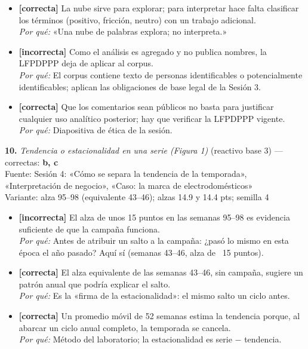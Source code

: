 \documentclass[10pt,letterpaper]{article}
\begin{document}
{\begin{itemize}[leftmargin=1.2em,itemsep=0pt,topsep=1pt,parsep=0pt]
\item[\textbf{b)}] {\footnotesize \textbf{[correcta]} La nube sirve para explorar; para interpretar hace falta clasificar los términos (positivo, fricción, neutro) con un trabajo adicional.\\ \textit{Por qué:} «Una nube de palabras explora; no interpreta.»}
\item[\textbf{c)}] {\footnotesize \textbf{[incorrecta]} Como el análisis es agregado y no publica nombres, la LFPDPPP deja de aplicar al corpus.\\ \textit{Por qué:} El corpus contiene texto de personas identificables o potencialmente identificables; aplican las obligaciones de base legal de la Sesión 3.}
\item[\textbf{d)}] {\footnotesize \textbf{[correcta]} Que los comentarios sean públicos no basta para justificar cualquier uso analítico posterior; hay que verificar la LFPDPPP vigente.\\ \textit{Por qué:} Diapositiva de ética de la sesión.}
\end{itemize}
\vspace{3pt}\noindent\textbf{10.} \textit{Tendencia o estacionalidad en una serie (Figura 1)} (reactivo base 3) — correctas: \textbf{b, c}\\[-1pt]
{\scriptsize Fuente: Sesión 4: «Cómo se separa la tendencia de la temporada», «Interpretación de negocio», «Caso: la marca de electrodomésticos»}
\\{\scriptsize Variante: alza 95--98 (equivalente 43--46); alzas 14.9 y 14.4 pts; semilla 4}
\begin{itemize}[leftmargin=1.2em,itemsep=0pt,topsep=1pt,parsep=0pt]
\item[\textbf{a)}] {\footnotesize \textbf{[incorrecta]} El alza de unos 15 puntos en las semanas 95--98 es evidencia suficiente de que la campaña funciona.\\ \textit{Por qué:} Antes de atribuir un salto a la campaña: ¿pasó lo mismo en esta época el año pasado? Aquí sí (semanas 43--46, alza de ~15 puntos).}
\item[\textbf{b)}] {\footnotesize \textbf{[correcta]} El alza equivalente de las semanas 43--46, sin campaña, sugiere un patrón anual que podría explicar el salto.\\ \textit{Por qué:} Es la «firma de la estacionalidad»: el mismo salto un ciclo antes.}
\item[\textbf{c)}] {\footnotesize \textbf{[correcta]} Un promedio móvil de 52 semanas estima la tendencia porque, al abarcar un ciclo anual completo, la temporada se cancela.\\ \textit{Por qué:} Método del laboratorio; la estacionalidad es serie $-$ tendencia.}

\end{itemize}}
\end{document}
